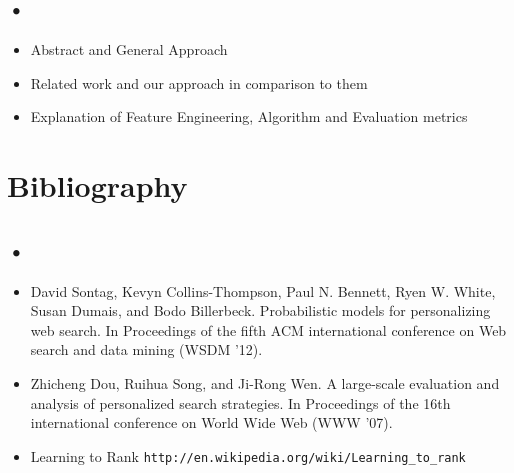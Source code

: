 \documentclass[11pt]{article}
\begin{document}
\subsection*{•}
\vspace{-5mm}
\begin{itemize}\setlength{\itemsep}{-5pt}
\item Abstract and General Approach
\item Related work and our approach in comparison to them
\item Explanation of Feature Engineering, Algorithm and Evaluation metrics  
\end{itemize}
\noindent
\section{Bibliography}
\subsection*{•}
\vspace{-5mm}
\begin{itemize}\setlength{\itemsep}{-5pt}
\item David Sontag, Kevyn Collins-Thompson, Paul N. Bennett, Ryen W. White, Susan Dumais, and Bodo Billerbeck. Probabilistic models for personalizing web search. In Proceedings of the fifth ACM international conference on Web search and data mining (WSDM '12).
\item Zhicheng Dou, Ruihua Song, and Ji-Rong Wen.  A large-scale evaluation and analysis of personalized search strategies. In Proceedings of the 16th international conference on World Wide Web (WWW '07).
\item Learning to Rank \texttt{http://en.wikipedia.org/wiki/Learning\_to\_rank}

\end{itemize}
\end{document}

